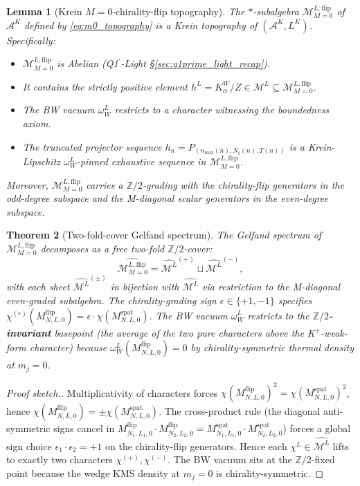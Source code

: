 \documentclass[11pt,a4paper]{article}
\theoremstyle{plain}
\newtheorem{theorem}{Theorem}[section]
\newtheorem{lemma}[theorem]{Lemma}
\theoremstyle{definition}
\newcommand{\nmax}{n_{\max}}
\newcommand{\Nt}{N_{t}}
\newcommand{\Acal}{\mathcal{A}}
\newcommand{\Mcal}{\mathcal{M}}
\newcommand{\Z}{\mathbb{Z}}
\newcommand{\BWvac}{\omega_{W}^{L}}
\newcommand{\Kalpha}{K_{\alpha}^{W}}
\newcommand{\MflipMzero}{\Mcal^{L,\mathrm{flip}}_{M=0}}
\newcommand{\Mflip}[3]{M^{\mathrm{flip}}_{#1,#2,#3}}
\newcommand{\Mspat}[3]{M^{\mathrm{spat}}_{#1,#2,#3}}
\begin{document}
\begin{lemma}[Krein $M=0$-chirality-flip topography]
\label{lem:phase1_topography}
The $*$-subalgebra $\MflipMzero$ of $\Acal^{K}$ defined by
\eqref{eq:m0_topography} is a Krein topography of $(\Acal^{K},L^{K})$.
Specifically:
\begin{itemize}
\item[(a)] $\MflipMzero$ is Abelian (Q1$^{\prime}$-Light
\S\ref{sec:q1prime_light_recap}).
\item[(b)] It contains the strictly positive element $h^{L}=\Kalpha/Z
\in\Mcal^{L}\subseteq\MflipMzero$.
\item[(c)] The BW vacuum $\BWvac$ restricts to a character witnessing
the boundedness axiom.
\item[(d)] The truncated projector sequence
$h_{n}=P_{(\nmax(n),\Nt(n),T(n))}$ is a Krein-Lipschitz
$\BWvac$-pinned exhaustive sequence in $\MflipMzero$.
\end{itemize}
Moreover, $\MflipMzero$ carries a $\Z/2$-grading with the
chirality-flip generators in the odd-degree subspace and the
M-diagonal scalar generators in the even-degree subspace.
\end{lemma}

\begin{theorem}[Two-fold-cover Gelfand spectrum]
\label{thm:phase1_two_fold_cover}
The Gelfand spectrum of $\MflipMzero$ decomposes as a free two-fold
$\Z/2$-cover:
\begin{equation}
  \widehat{\MflipMzero} = \widehat{\Mcal^{L}}^{(+)} \sqcup \widehat{\Mcal^{L}}^{(-)},
  \label{eq:two_fold_cover}
\end{equation}
with each sheet $\widehat{\Mcal^{L}}^{(\pm)}$ in bijection with
$\widehat{\Mcal^{L}}$ via restriction to the M-diagonal even-graded
subalgebra. The chirality-grading sign $\epsilon\in\{+1,-1\}$
specifies $\chi^{(\epsilon)}(\Mflip{N}{L}{0}) = \epsilon\cdot
\chi(\Mspat{N}{L}{0})$. The BW vacuum $\BWvac$ restricts to the
\textbf{$\Z/2$-invariant} basepoint (the average of the two pure
characters above the K$^{+}$-weak-form character) because
$\BWvac(\Mflip{N}{L}{0})=0$ by chirality-symmetric thermal density
at $m_{j}=0$.
\end{theorem}

\begin{proof}[Proof sketch.]
Multiplicativity of characters forces $\chi(\Mflip{N}{L}{0})^{2}=
\chi(\Mspat{N}{L}{0})^{2}$, hence
$\chi(\Mflip{N}{L}{0})=\pm\chi(\Mspat{N}{L}{0})$. The cross-product
rule (the diagonal anti-symmetric signs cancel in
$\Mflip{N_{1}}{L_{1}}{0}\cdot\Mflip{N_{2}}{L_{2}}{0}=\Mspat{N_{1}}{L_{1}}{0}\cdot
\Mspat{N_{2}}{L_{2}}{0}$) forces a global sign choice
$\epsilon_{1}\cdot\epsilon_{2}=+1$ on the chirality-flip generators.
Hence each $\chi^{L}\in\widehat{\Mcal^{L}}$ lifts to exactly two
characters $\chi^{(+)},\chi^{(-)}$. The BW vacuum sits at the
$\Z/2$-fixed point because the wedge KMS density at $m_{j}=0$ is
chirality-symmetric.
\end{proof}
\end{document}
